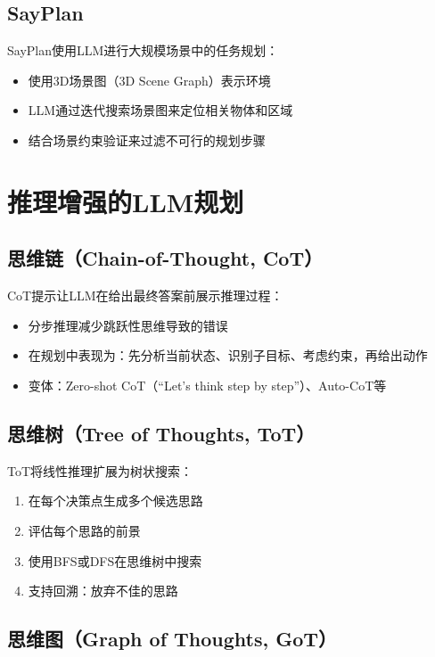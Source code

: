 \subsection{SayPlan \self}

SayPlan使用LLM进行大规模场景中的任务规划：
\begin{itemize}
  \item 使用3D场景图（3D Scene Graph）表示环境
  \item LLM通过迭代搜索场景图来定位相关物体和区域
  \item 结合场景约束验证来过滤不可行的规划步骤
\end{itemize}

\section{推理增强的LLM规划 \grad}

\subsection{思维链（Chain-of-Thought, CoT）}

\begin{keypoint}
CoT提示让LLM在给出最终答案前展示推理过程：
\begin{itemize}
  \item 分步推理减少跳跃性思维导致的错误
  \item 在规划中表现为：先分析当前状态、识别子目标、考虑约束，再给出动作
  \item 变体：Zero-shot CoT（``Let's think step by step''）、Auto-CoT等
\end{itemize}
\end{keypoint}

\subsection{思维树（Tree of Thoughts, ToT）}

ToT将线性推理扩展为树状搜索：
\begin{enumerate}
  \item 在每个决策点生成多个候选思路
  \item 评估每个思路的前景
  \item 使用BFS或DFS在思维树中搜索
  \item 支持回溯：放弃不佳的思路
\end{enumerate}

\subsection{思维图（Graph of Thoughts, GoT）\self}

